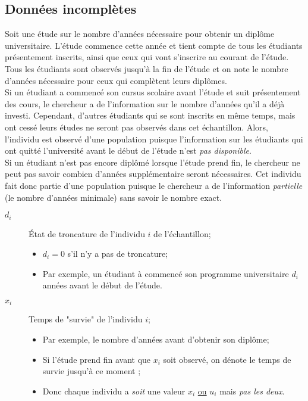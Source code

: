 \documentclass[10pt, french]{article}
\begin{document}
\begin{multicols*}{2}
\columnbreak
\subsection{Données incomplètes}

\begin{rappel_enhanced}[Exemple]
Soit une étude sur le nombre d'années nécessaire pour obtenir un diplôme universitaire. L'étude commence cette année et tient compte de tous les étudiants présentement inscrits, ainsi que ceux qui vont s'inscrire au courant de l'étude. Tous les étudiants sont observés jusqu'à la fin de l'étude et on note le nombre d'années nécessaire pour ceux qui complètent leurs diplômes. \\

Si un étudiant a commencé son cursus scolaire avant l'étude et suit présentement des cours, le chercheur a de l'information sur le nombre d'années qu'il a déjà investi. Cependant, d'autres étudiants qui se sont inscrits en même temps, mais ont cessé leurs études ne seront pas observés dans cet échantillon. Alors, l'individu est observé d'une population  puisque l'information sur les étudiants qui ont quitté l'université avant le début de l'étude n'est \textit{pas disponible}.\\

Si un étudiant n'est pas encore diplômé lorsque l'étude prend fin, le chercheur ne peut pas savoir combien d'années supplémentaire seront nécessaires. Cet individu fait donc partie d'une population  puisque le chercheur a de l'information \textit{partielle} (le nombre d'années minimale) sans savoir le nombre exact.
\end{rappel_enhanced}

\begin{distributions}[Notation]
\begin{description}
	\item[$d_{i}$]	État de troncature de l'individu $i$ de l'échantillon;
		\begin{itemize}[leftmargin = *]
		\item	$d_{i}	=	0$ s'il n'y a pas de troncature;
		\item	Par exemple, un étudiant à commencé son programme universitaire $d_{i}$ années avant le début de l'étude.
		\end{itemize}
	\item[$x_{i}$]	Temps de "survie" de l'individu $i$;
		\begin{itemize}[leftmargin = *]
		\item	Par exemple, le nombre d'années avant d'obtenir son diplôme;
		\item	Si l'étude prend fin avant que $x_{i}$ soit observé, on dénote le temps de survie jusqu'à ce moment ;
		\item	Donc chaque individu a \textit{soit} une valeur $x_{i}$ \underline{ou} $u_{i}$ mais \textit{pas les deux}.
		\end{itemize}
\end{description}
\end{distributions}


\end{multicols*}
\end{document}
